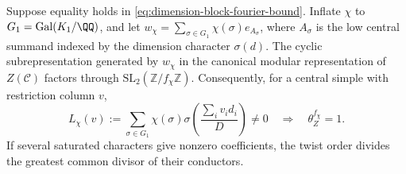 \begin{proposition}
\label{prop:saturated-conductor-support}
Suppose equality holds in \eqref{eq:dimension-block-fourier-bound}.
Inflate $\chi$ to $G_1=\operatorname{Gal}(K_1/\QQ)$, and let
$w_\chi=\sum_{\sigma\in G_1}\chi(\sigma)e_{A_\sigma}$, where
$A_\sigma$ is the low central summand indexed by the dimension
character $\sigma(d)$. The cyclic subrepresentation generated by
$w_\chi$ in the canonical modular representation of $Z(\mathcal C)$
factors through $\mathrm{SL}_2(\mathbb Z/f_\chi\mathbb Z)$.
Consequently, for a central simple with restriction column $v$,
\begin{equation}\label{eq:saturated-column-support}
 L_\chi(v):=\sum_{\sigma\in G_1}\chi(\sigma)
       \sigma\!\left(\frac{\sum_i v_i d_i}{D}\right)\ne0
 \quad\Longrightarrow\quad \theta_Z^{f_\chi}=1.
\end{equation}
If several saturated characters give nonzero coefficients, the twist
order divides the greatest common divisor of their conductors.
\end{proposition}
